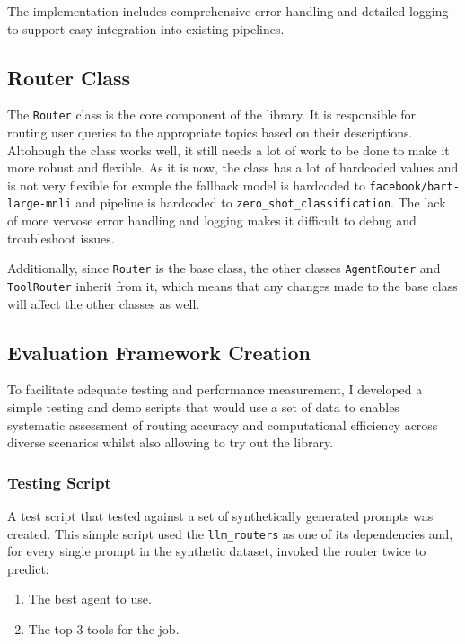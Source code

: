The implementation includes comprehensive error handling and detailed logging to support easy integration into existing pipelines.


\subsection{Router Class}
\label{router class}

The \texttt{Router} class is the core component of the library. It is responsible for routing user queries to the appropriate topics based on their descriptions. Altohough the class works well, it still needs a lot of work to be done to make it more robust and flexible. As it is now, the class has a lot of hardcoded values and is not very flexible for exmple the fallback model is hardcoded to \texttt{facebook/bart-large-mnli} and pipeline is hardcoded to \texttt{zero\_shot\_classification}. The lack of more vervose error handling and logging makes it difficult to debug and troubleshoot issues. 

Additionally, since \texttt{Router} is the base class, the other classes \texttt{AgentRouter} and \texttt{ToolRouter} inherit from it, which means that any changes made to the base class will affect the other classes as well.

\subsection{Evaluation Framework Creation}
\label{evaluation framework creation}
To facilitate adequate testing and performance measurement, I developed a simple testing and demo scripts that would use a set of data to enables systematic assessment of routing accuracy and computational efficiency across diverse scenarios whilst also allowing to try out the library.


\subsubsection{Testing Script}
\label{testing script}
A test script that tested against a set of synthetically generated prompts was created. This simple script used the \texttt{llm\_routers} as one of its dependencies and, for every single prompt in the synthetic dataset, invoked the router twice to predict:

\begin{enumerate}
    \item The best agent to use.
    \item The top 3 tools for the job.
\end{enumerate}

